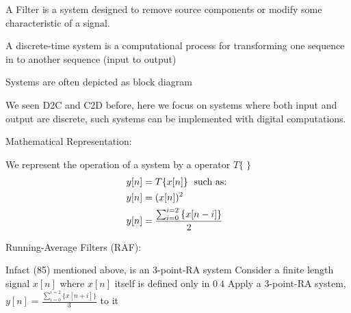 \documentclass{article}
\newlength\tindent
\renewcommand{\indent}{\hspace*{\tindent}}
\begin{document}
    \noindent A Filter is a system designed to remove source components or modify some characteristic of a signal.\\\indent

    \noindent A discrete-time system is a computational process for transforming 
    one sequence in to another sequence (input to output)\\\indent

    Systems are often depicted as block diagram
    \begin{center}
    \end{center}
    We seen D2C and C2D before, here we focus on systems where both input and output are discrete, 
    such systems can be implemented with digital computations.\\\indent

    \noindent Mathematical Representation:

    \noindent We represent the operation of a system by a operator $T\{\;\}$
    \begin{align}
        y[n] &= T\{x[n]\}\text{\; such as:\;}\\
        y[n] &= (x[n])^2\\
        y[n] &= \frac{\sum_{i = 0}^{i=2}{\{x[n-i]\}}}{2}
    \end{align}

    \noindent Running-Average Filters (RAF):\\\indent

    \noindent Infact (85) mentioned above, is an 3-point-RA system
    Consider a finite length signal $x[n]$ where $x[n]$ itself is defined only in $0~4$
    Apply a 3-point-RA system, $y[n] = \frac{\sum_{i = 0}^{i=2}{\{x[n+i]\}}}{3}$ to it
\end{document}
